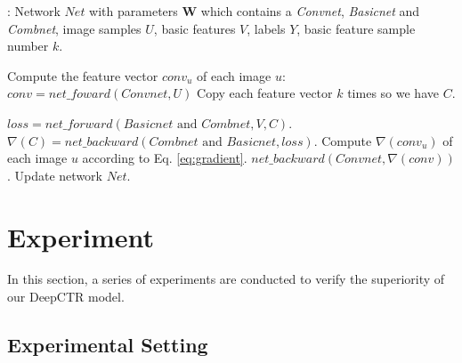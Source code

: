 \documentclass{sig-alternate}
\begin{document}
\begin{algorithm}[tb]
	\caption{$forward\_backward$}
	\label{alg:fb}
	\begin{algorithmic}[1]
		\renewcommand{\algorithmicrequire}{\textbf{Input:}}
		\renewcommand{\algorithmicensure}{\textbf{Output:}}
		\Require: Network $Net$ with parameters $\mathbf{W}$ which contains a \emph{Convnet}, \emph{Basicnet} and \emph{Combnet}, image samples $U$, basic features $V$, labels $Y$, basic feature sample number $k$. 
		
		
		
		\State Compute the feature vector $conv_{u}$ of each image $u$:
		$
		conv = net\_foward(Convnet, U)
		$
		\State Copy each feature vector $k$ times so we have $C$.
		
		\State  $loss = net\_forward(Basicnet \text{ and } Combnet, V, C)$.
		\State  $\nabla(C) = net\_backward(Combnet \text{ and } Basicnet, loss)$.
		\State Compute $\nabla(conv_{u})$ of each image $u$ according to Eq. \ref{eq:gradient}.
		\State $net\_backward(Convnet, \nabla(conv))$.
		\State Update network $Net$.
	\end{algorithmic}
\end{algorithm}  
\section{Experiment}
In this section, a series of experiments are conducted to verify the superiority of our DeepCTR model.
\subsection{Experimental Setting}
\end{document}
